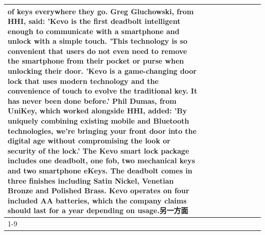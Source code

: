 \begin{table}[H]
\begin{tabular}{lllrlllll}
of keys everywhere they go. Greg Gluchowski, from HHI, said: 'Kevo is the first deadbolt intelligent enough to communicate with a smartphone and unlock with a simple touch. 'This technology is so convenient that users do not even need to remove the smartphone from their pocket or purse when unlocking their door. 'Kevo is a game-changing door lock that uses modern technology and the convenience of touch to evolve the traditional key. It has never been done before.' Phil Dumas, from UniKey, which worked alongside HHI, added: 'By uniquely combining existing mobile and Bluetooth technologies, we’re bringing your front door into the digital age without compromising the look or security of the lock.' The Kevo smart lock package includes one deadbolt, one fob, two mechanical keys and two smartphone eKeys. The deadbolt comes in three finishes including Satin Nickel, Venetian Bronze and Polished Brass. Kevo operates on four included AA batteries, which the company claims should last for a year depending on usage.另一方面 \\
\cline{1-9}

\end{tabular}
\end{table}
